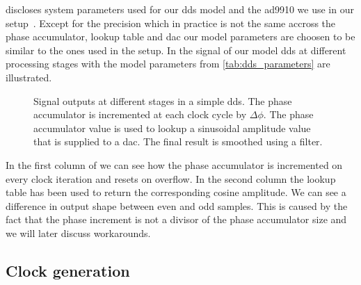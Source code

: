  discloses system parameters used for our \gls{dds}
model and the \gls{ad9910} we use in our setup~\cite{AD9910}. Except for the
precision which in practice is not the same accross the phase accumulator,
lookup table and \gls{dac} our model parameters are choosen to be similar to
the ones used in the setup. In  the signal of our
model \gls{dds} at different processing stages with the model parameters
from \cref{tab:dds_parameters} are illustrated.
\begin{figure}[htb]
  \centering
  \begin{adjustbox}{width=\textwidth}
    
  \end{adjustbox}
  \caption{Signal outputs at different stages in a simple \gls{dds}. The
    phase accumulator is incremented at each clock cycle by $\Delta\phi$. The
    phase accumulator value is used to lookup a sinusoidal amplitude value
    that is supplied to a \gls{dac}. The final result is smoothed using a
    filter.}\label{fig:dds_simple_output}
\end{figure}
In the first column of  we can see how the phase
accumulator is incremented on every clock iteration and resets on overflow.
In the second column the lookup table has been used to return the
corresponding cosine amplitude. We can see a difference in output shape
between even and odd samples. This is caused by the fact that the phase
increment is not a divisor of the phase accumulator size and we will later
discuss workarounds.

\subsection{Clock generation}


